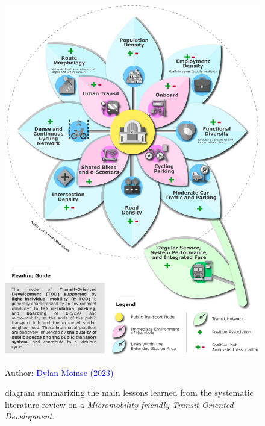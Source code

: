 \begin{refsegment}
\begin{figure}[h!]\vspace*{4pt}
    \caption{ diagram summarizing the main lessons learned from the systematic literature review on a \textsl{Micromobility-friendly Transit-Oriented Development}.}
    \label{fig-chap2:synthese-resultats-btod-rsl}
    \centerline{\includegraphics[width=1\columnwidth]{src/Figures/Chap-2/EN_RSL_Fleur_TOD.pdf}}
    \vspace{5pt}
    \begin{flushright}\scriptsize{
    Author: \textcolor{blue}{Dylan Moinse (2023)}
    }\end{flushright}
\end{figure}


\end{refsegment}
